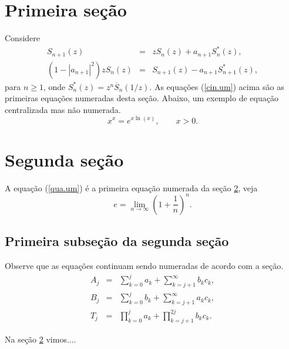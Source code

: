 \documentclass{TEMA}
\begin{document}
\begin{framed}
\begin{minipage}{10cm}
\setcounter{section}{0}

\section{Primeira seção}
\label{cin} Considere
\begin{equation} \label{cin.um}
   \begin{array}{rcl}
     S_{n+1}(z) & = & z S_{n}(z) +
     a_{n+1} S_{n}^{*}(z), \\ [1ex]
     \left(1-|a_{n+1}|^2\right) z S_{n}(z) & = &
     S_{n+1}(z) - a_{n+1} S_{n+1}^{*}(z),
   \end{array} 
\end{equation}
para $n \geq 1$, onde $S_n^{*}(z) = z^n \overline{S}_n(1/z)$.
As equações (\ref{cin.um}) acima são as primeiras
equações numeradas desta seção. Abaixo, um exemplo de  equação
centralizada mas não numerada.
\[ x^x = e^{x \ln(x)}, \qquad x > 0. \]

\section{Segunda seção}
\label{qua}

A equação (\ref{qua.um}) é a primeira equação numerada da seção
\ref{qua}, veja
\begin{equation} \label{qua.um}
e = \lim_{n\rightarrow\infty} \left( 1+\frac{1}{n}\right)^n.
\end{equation}

\subsection{Primeira subseção da segunda seção} 
Observe que as equações continuam sendo numeradas de acordo
com a seção.
\begin{eqnarray} \label{qua.dois}
A_{j} &=&\sum_{k=0}^j a_k +\sum_{k=j+1}^{\infty} b_k c_k, \\
B_{j} &=&\sum_{k=0}^j b_k +\sum_{k=j+1}^{\infty} a_k c_k,\\
T_{j} &=&\prod_{k=0}^j a_k+\prod_{k=j+1}^{2j} b_k c_k.\nonumber
\end{eqnarray}

{} 

Na seção \ref{qua} vimos....

\end{minipage}
\end{framed}
\end{document}
